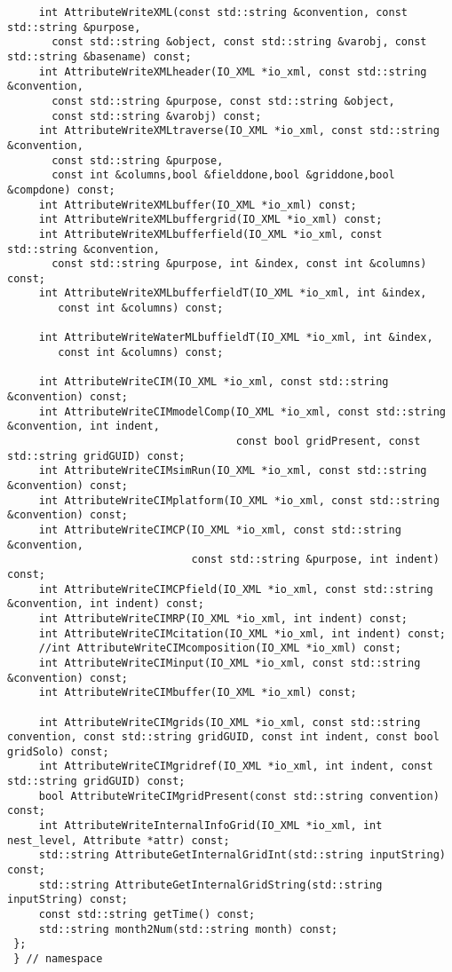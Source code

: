 \begin{verbatim}
     int AttributeWriteXML(const std::string &convention, const std::string &purpose,
       const std::string &object, const std::string &varobj, const std::string &basename) const;
     int AttributeWriteXMLheader(IO_XML *io_xml, const std::string &convention,
       const std::string &purpose, const std::string &object,
       const std::string &varobj) const;
     int AttributeWriteXMLtraverse(IO_XML *io_xml, const std::string &convention,
       const std::string &purpose,
       const int &columns,bool &fielddone,bool &griddone,bool &compdone) const;
     int AttributeWriteXMLbuffer(IO_XML *io_xml) const;
     int AttributeWriteXMLbuffergrid(IO_XML *io_xml) const;
     int AttributeWriteXMLbufferfield(IO_XML *io_xml, const std::string &convention,
       const std::string &purpose, int &index, const int &columns) const;
     int AttributeWriteXMLbufferfieldT(IO_XML *io_xml, int &index,
        const int &columns) const;
 
     int AttributeWriteWaterMLbuffieldT(IO_XML *io_xml, int &index,
        const int &columns) const;
 
     int AttributeWriteCIM(IO_XML *io_xml, const std::string &convention) const;
     int AttributeWriteCIMmodelComp(IO_XML *io_xml, const std::string &convention, int indent,
                                    const bool gridPresent, const std::string gridGUID) const;
     int AttributeWriteCIMsimRun(IO_XML *io_xml, const std::string &convention) const;
     int AttributeWriteCIMplatform(IO_XML *io_xml, const std::string &convention) const;
     int AttributeWriteCIMCP(IO_XML *io_xml, const std::string &convention,
                             const std::string &purpose, int indent) const;
     int AttributeWriteCIMCPfield(IO_XML *io_xml, const std::string &convention, int indent) const;
     int AttributeWriteCIMRP(IO_XML *io_xml, int indent) const;
     int AttributeWriteCIMcitation(IO_XML *io_xml, int indent) const;
     //int AttributeWriteCIMcomposition(IO_XML *io_xml) const;
     int AttributeWriteCIMinput(IO_XML *io_xml, const std::string &convention) const;
     int AttributeWriteCIMbuffer(IO_XML *io_xml) const;
 
     int AttributeWriteCIMgrids(IO_XML *io_xml, const std::string convention, const std::string gridGUID, const int indent, const bool gridSolo) const;
     int AttributeWriteCIMgridref(IO_XML *io_xml, int indent, const std::string gridGUID) const;
     bool AttributeWriteCIMgridPresent(const std::string convention) const;
     int AttributeWriteInternalInfoGrid(IO_XML *io_xml, int nest_level, Attribute *attr) const;
     std::string AttributeGetInternalGridInt(std::string inputString) const;
     std::string AttributeGetInternalGridString(std::string inputString) const;
     const std::string getTime() const;
     std::string month2Num(std::string month) const;
 };
 } // namespace
 

\end{verbatim}
